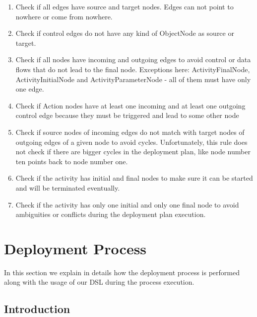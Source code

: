 \noindent \begin{enumerate}
\item Check if all edges have source and target nodes. Edges can not point to nowhere or come from nowhere.

\item  Check if control edges do not have any kind of ObjectNode as source or target.

\item  Check if all nodes have incoming and outgoing edges to avoid control or data flows that do not lead to the final node. Exceptions here: ActivityFinalNode, ActivityInitialNode and ActivityParameterNode - all of them must have only one edge.

\item  Check if Action nodes have at least one incoming and at least one outgoing control edge because they must be triggered and lead to some other node

\item  Check if source nodes of incoming edges do not match with target nodes of outgoing edges of a given node to avoid cycles. Unfortunately, this rule does not check if there are bigger cycles in the deployment plan, like node number ten points back to node number one.

\item  Check if the activity has initial and final nodes to make sure it can be started and will be terminated eventually.

\item  Check if the activity has only one initial and only one final node to avoid ambiguities or conflicts during the deployment plan execution.
\end{enumerate}

\section{Deployment Process} 

In this section we explain in details how the deployment process is performed along with the usage of our DSL during the process execution.

\subsection{Introduction} 

